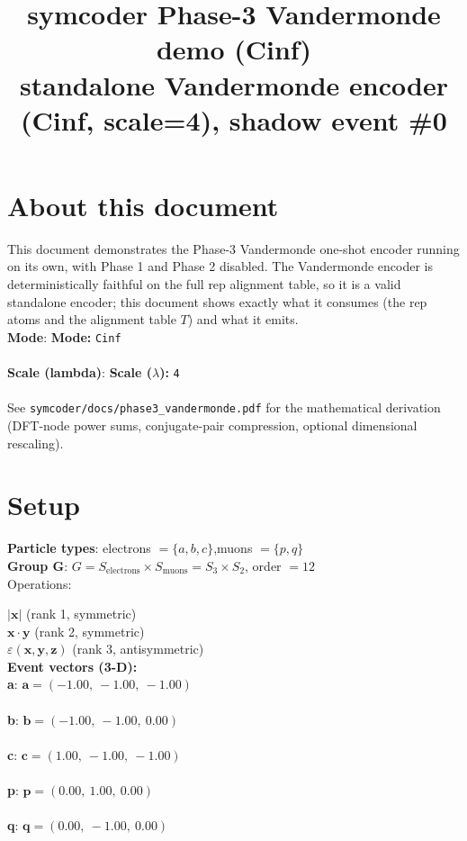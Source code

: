 \documentclass[a4paper,11pt]{article}
\title{symcoder Phase-3 Vandermonde demo (Cinf)\\\large standalone Vandermonde encoder (Cinf, scale=4), shadow event \#0}
\date{}
\newcommand{\vc}[1]{\ensuremath{\mathbf{#1}}}
\newcommand{\dnfagmiihhiejm}[1]{|\vc{#1}|}
\newcommand{\pdcegfomjfhook}[2]{\mathbf{#1} \cdot \mathbf{#2}}
\newcommand{\kblbmcpggoncpf}[3]{\varepsilon(\mathbf{#1},\mathbf{#2},\mathbf{#3})}
\begin{document}
\maketitle

\section{About this document}
This document demonstrates the Phase-3 Vandermonde one-shot encoder running on its own, with Phase 1 and Phase 2 disabled.  The Vandermonde encoder is deterministically faithful on the full rep alignment table, so it is a valid standalone encoder; this document shows exactly what it consumes (the rep atoms and the alignment table $T$) and what it emits.\\[1ex]
\textbf{Mode}: \textbf{Mode:} \texttt{Cinf}\\\\
\textbf{Scale (lambda)}: \textbf{Scale ($\lambda$):} \texttt{4}\\\\
See \texttt{symcoder/docs/phase3\_vandermonde.pdf} for the mathematical derivation (DFT-node power sums, conjugate-pair compression, optional dimensional rescaling).\\[1ex]

\section{Setup}
\textbf{Particle types}: electrons $= \{a, b, c\}$,\quad muons $= \{p, q\}$\\
\textbf{Group G}: $G = S_{\text{electrons}} \times S_{\text{muons}} = S_{3} \times S_{2}$, order $= 12$\\

Operations:

$\dnfagmiihhiejm{x}$ \quad (rank 1, symmetric)\\
$\pdcegfomjfhook{x}{y}$ \quad (rank 2, symmetric)\\
$\kblbmcpggoncpf{x}{y}{z}$ \quad (rank 3, antisymmetric)\\

\textbf{Event vectors (3-D):}\\
\textbf{  a}: $\vc{a} = (-1.00,\ -1.00,\ -1.00)$\\\\
\textbf{  b}: $\vc{b} = (-1.00,\ -1.00,\ 0.00)$\\\\
\textbf{  c}: $\vc{c} = (1.00,\ -1.00,\ -1.00)$\\\\
\textbf{  p}: $\vc{p} = (0.00,\ 1.00,\ 0.00)$\\\\
\textbf{  q}: $\vc{q} = (0.00,\ -1.00,\ 0.00)$\\\\
\end{document}
